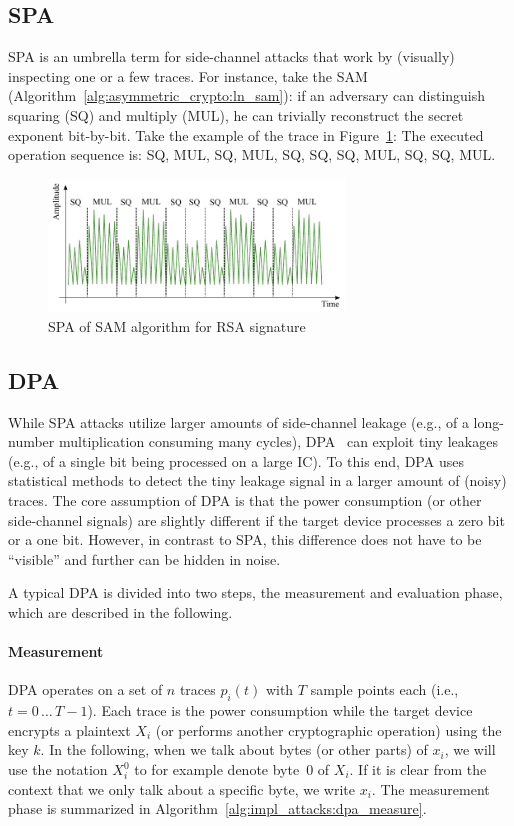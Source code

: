 \subsection{\acl{SPA}}
\acf{SPA} is an umbrella term for side-channel attacks that work by (visually) inspecting one or a few traces. For instance, take the \ac{SAM} (Algorithm~\ref{alg:asymmetric_crypto:ln_sam}): if an adversary can distinguish squaring (SQ) and multiply (MUL), he can trivially reconstruct the secret exponent bit-by-bit. Take the example of the trace in Figure~\ref{fig:impl_attacks:spa_rsa}: The executed operation sequence is: SQ, MUL, SQ, MUL, SQ, SQ, SQ, MUL, SQ, SQ, MUL. 

\begin{figure}[h!tb]
		\center
		\includegraphics[width=0.7\textwidth]{figures/impl_attacks/spa_rsa}	
		\caption{\ac{SPA} of \ac{SAM} algorithm for \ac{RSA} signature}
		\label{fig:impl_attacks:spa_rsa}
\end{figure} 

\subsection{\acl{DPA}}
\label{sec:impl_attacks:dpa}
While \ac{SPA} attacks utilize larger amounts of side-channel leakage (e.g., of a long-number multiplication consuming many cycles), \acf{DPA}~\cite{dpa_kocher} can exploit tiny leakages (e.g., of a single bit being processed on a large \ac{IC}). To this end, \ac{DPA} uses statistical methods to detect the tiny leakage signal in a larger amount of (noisy) traces. The core assumption of \ac{DPA} is that the power consumption (or other side-channel signals) are slightly different if the target device processes a zero bit or a one bit. However, in contrast to \ac{SPA}, this difference does not have to be ``visible'' and further can be hidden in noise.

A typical \ac{DPA} is divided into two steps, the measurement and evaluation phase, which are described in the following.

\paragraph{Measurement}
\ac{DPA} operates on a set of $n$ traces $p_i \left( t \right)$ with $T$ sample points each (i.e., $t = 0\,\ldots\,T-1$). Each trace is the power consumption while the target device encrypts a plaintext $X_i$ (or performs another cryptographic operation) using the key $k$. In the following, when we talk about bytes (or other parts) of $x_i$, we will use the notation $X_i^0$ to for example denote byte~0 of $X_i$. If it is clear from the context that we only talk about a specific byte, we write $x_i$. The measurement phase is summarized in Algorithm~\ref{alg:impl_attacks:dpa_measure}.

